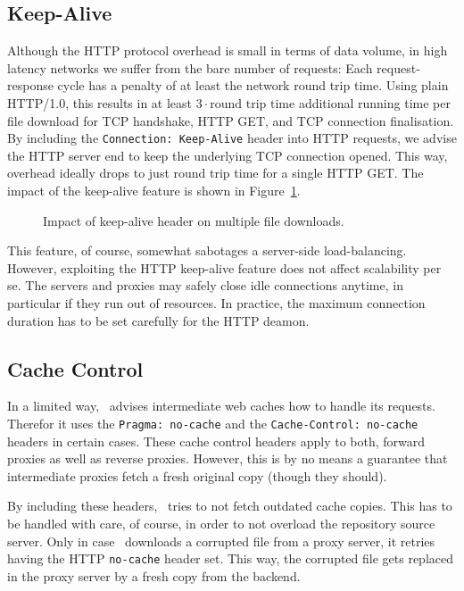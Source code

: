 \subsection{Keep-Alive}
Although the HTTP protocol overhead is small in terms of data volume, in high latency networks we suffer from the bare number of requests: Each request-response cycle has a penalty of at least the network round trip time. 
Using plain HTTP/1.0, this results in at least $3\cdot\text{round trip time}$ additional running time per file download for TCP handshake, HTTP GET, and TCP connection finalisation.
By including the \texttt{Connection:~Keep-Alive} header into HTTP requests, we advise the HTTP server end to keep the underlying TCP connection opened.
This way, overhead ideally drops to just round trip time for a single HTTP GET.
The impact of the keep-alive feature is shown in Figure~\ref{fig:keepalive}.
\begin{figure}
	\begin{center}
		\resizebox{0.5\linewidth}{!}{}
	\end{center}
	\caption{Impact of keep-alive header on multiple file downloads.}
	\label{fig:keepalive}
\end{figure}

This feature, of course, somewhat sabotages a server-side load-balancing.
However, exploiting the HTTP keep-alive feature does not affect scalability per se. 
The servers and proxies may safely close idle connections anytime, in particular if they run out of resources.
In practice, the maximum connection duration has to be set carefully for the HTTP deamon.

\subsection{Cache Control}
\label{sct:cachecontrol}
In a limited way, \cvmfs\ advises intermediate web caches how to handle its requests.
Therefor it uses the \texttt{Pragma:~no-cache} and the \texttt{Cache-Control:~no-cache} headers in certain cases.
These cache control headers apply to both, forward proxies as well as reverse proxies.
However, this is by no means a guarantee that intermediate proxies fetch a fresh original copy (though they should).

By including these headers, \cvmfs\ tries to not fetch outdated cache copies.
This has to be handled with care, of course, in order to not overload the repository source server.
Only in case \cvmfs\ downloads a corrupted file from a proxy server, it retries having the HTTP \texttt{no-cache} header set.
This way, the corrupted file gets replaced in the proxy server by a fresh copy from the backend.

